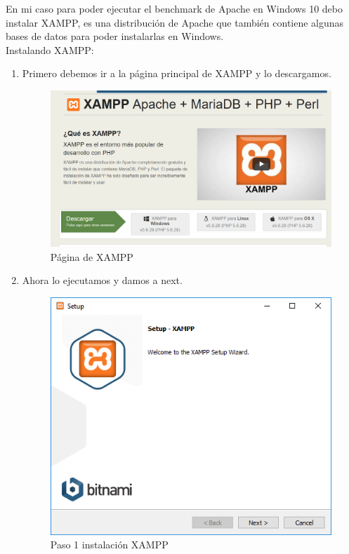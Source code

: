 En mi caso para poder ejecutar el benchmark de Apache en Windows 10 debo instalar XAMPP, es una distribución de Apache que también contiene algunas bases de datos para poder instalarlas en Windows.\\

Instalando XAMPP:

\begin{enumerate}
	
	\item Primero debemos ir a la página principal de XAMPP \cite{xampp} y lo descargamos.
	
	\begin{figure}[H] %
		\centering
		\includegraphics[scale=0.3]{pics/xampp1}  %
		\caption{Página de XAMPP} \label{fig:XAMPP1}
	\end{figure}
	
	\item Ahora lo ejecutamos y damos a next.
	
	\begin{figure}[H] %
		\centering
		\includegraphics[scale=0.4]{pics/xampp2}  %
		\caption{Paso 1 instalación XAMPP} \label{fig:XAMPP2}
	\end{figure}
	

\end{enumerate}
